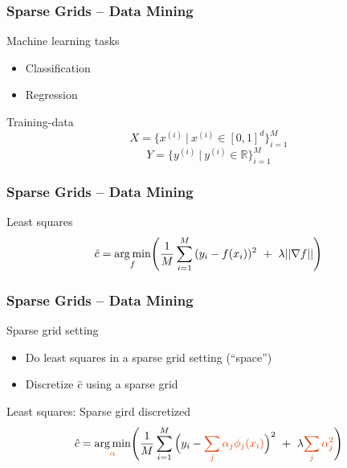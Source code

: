 \begin{frame}
  \frametitle{Sparse Grids -- Data Mining}
  \topline
  \vspace{-10px}
  \begin{block}{Machine learning tasks}
    \begin{itemize}
      \item Classification
      \item Regression
    \end{itemize}
  \end{block}
    \begin{block}{Training-data}
    $$ X = \{x^{(i)} \ | \ x^{(i)} \in [0, 1]^d\}_{i = 1}^M$$
    \vspace{0px}
    $$Y = \{y^{(i)} \ | \ y^{(i)} \in \mathbb{R}\}_{i = 1}^M$$
  \end{block}
\end{frame}

\begin{frame}
  \frametitle{Sparse Grids -- Data Mining}
  \topline
  \vspace{-10px}
  \begin{block}{Least squares}
    $$\hat{c} = \underset{f}{\text{arg \hspace{-0.5mm}min}}\Bigg(\frac{1}{M}\sum\limits_{i = 1}^{M}{(y_i - f(x_i))^2 \ + \ \lambda ||\nabla f||} \Bigg)$$
  \end{block}
\end{frame}

\begin{frame}
  \frametitle{Sparse Grids -- Data Mining}
  \topline
  \vspace{-10px}
  \begin{block}{Sparse grid setting}
    \begin{itemize}
    \item Do least squares in a sparse grid setting (``space'')
    \item Discretize $\hat{c}$ using a sparse grid
    \end{itemize}
  \end{block}
  \begin{block}{Least squares: Sparse gird discretized}
    $$\hat{c} = \underset{\color{uipoppy}{\alpha}}{\text{arg \hspace{-0.5mm}min}}\Bigg(\frac{1}{M}
    \sum\limits_{i = 1}^{M}{\Big(y_i - \color{uipoppy}{\sum_j{\alpha_j}\phi_j(x_i)}\color{black}\Big)^2 \ + \ 
      \lambda \color{uipoppy}{\sum_j{\alpha_j^2}}}\color{black} \Bigg)$$
  \end{block}
\end{frame}



